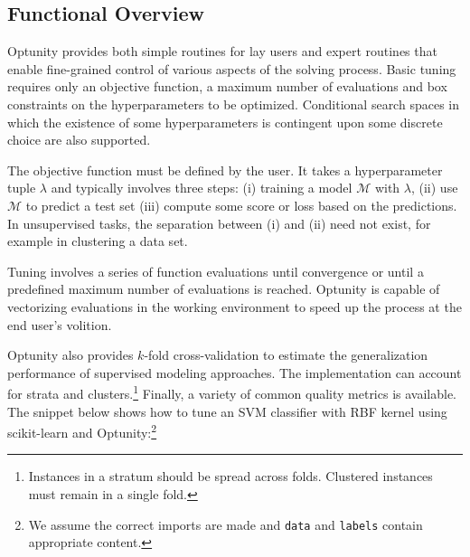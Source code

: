\documentclass[twoside,11pt]{article}
\newcommand{\optunity}{{\sc Optunity}\xspace}
\begin{document}
\subsection{Functional Overview}
\optunity provides both simple routines for lay users and expert routines that enable fine-grained control of various aspects of the solving process. Basic tuning requires only an objective function, a maximum number of evaluations and box constraints on the hyperparameters to be optimized. Conditional search spaces in which the existence of some hyperparameters is contingent upon some discrete choice are also supported.

The objective function must be defined by the user. It takes a hyperparameter tuple $\lambda$ and typically involves three steps: (i) training a model $\mathcal{M}$ with $\lambda$, (ii) use $\mathcal{M}$ to predict a test set (iii) compute some score or loss based on the predictions. In unsupervised tasks, the separation between (i) and (ii) need not exist, for example in clustering a data set.

Tuning involves a series of function evaluations until convergence or until a predefined maximum number of evaluations is reached. \optunity is capable of vectorizing evaluations in the working environment to speed up the process at the end user's volition.

\optunity also provides $k$-fold cross-validation to estimate the generalization performance of supervised modeling approaches. The implementation can account for strata and clusters.\footnote{Instances in a stratum should be spread across folds. Clustered instances must remain in a single fold.} Finally, a variety of common quality metrics is available. 
The snippet below shows how to tune an SVM classifier with RBF kernel using {\sc scikit-learn} and \optunity:\footnote{We assume the correct imports are made and \texttt{data} and \texttt{labels} contain appropriate content.}
\end{document}
